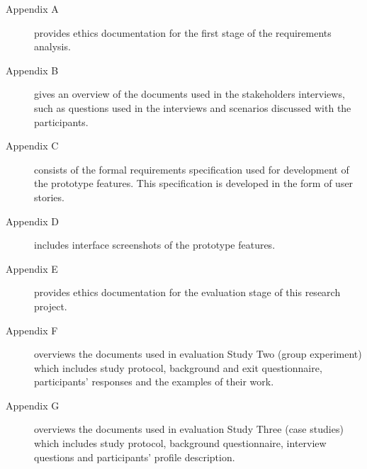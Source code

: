 \begin{description}
\item[Appendix A] provides ethics documentation for the first stage of the
requirements analysis.
\item[Appendix B] gives an overview of the documents used in the stakeholders
interviews, such as questions used in the interviews and scenarios discussed
with the participants.
\item[Appendix C] consists of the formal requirements specification used for
development of the prototype features. This specification is developed in the
form of user stories.
\item[Appendix D] includes interface screenshots of the prototype features. 
\item[Appendix E] provides ethics documentation for the evaluation stage of this
research project.
\item[Appendix F] overviews the documents used in evaluation Study Two (group
experiment) which includes study protocol, background and exit questionnaire,
participants' responses and the examples of their work.
\item[Appendix G] overviews the documents used in evaluation Study Three (case
studies) which includes study protocol, background questionnaire, interview
questions and participants' profile description.
\end{description}